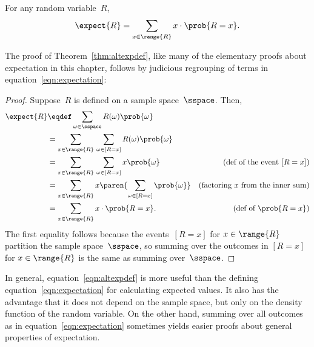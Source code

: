 \begin{theorem}\label{thm:altexpdef}
For any random variable~$R$,
\begin{equation}\label{eqn:altexpdef}
    \expect{R} = \sum_{x \in \range{R}} x \cdot \prob{R = x}.
\end{equation}
\end{theorem}
The proof of Theorem~\ref{thm:altexpdef}, like many of the elementary proofs
about expectation in this chapter, follows by judicious regrouping of terms
in equation~\eqref{eqn:expectation}:
\begin{proof}
Suppose~$R$ is defined on a sample space~$\sspace$.  Then,
\begin{align*}
\expect{R}
    &\eqdef \sum_{\omega \in \sspace} R(\omega) \prob{\omega}\\
    &= \sum_{x \in \range{R}} \, \sum_{\omega \in [R=x]} R(\omega) \prob{\omega}
                \\
    &= \sum_{x \in \range{R}} \, \sum_{\omega \in [R=x]} x \prob{\omega}
            &\text{(def of the event $[R=x]$)}\\
    &= \sum_{x \in \range{R}} x \paren{\sum_{\omega \in [R=x]} \prob{\omega}}
            & \text{(factoring $x$ from the inner sum)} \\
    &= \sum_{x \in \range{R}} x \cdot \prob{R = x}.
            & \text{(def of $\prob{R=x}$)}
\end{align*}
The first equality follows because the events~$[R=x]$ for $x \in
\range{R}$ partition the sample space~$\sspace$, so summing over the
outcomes in $[R=x]$ for $x \in \range{R}$ is the same as summing
over~$\sspace$.
\end{proof}

In general, equation~\eqref{eqn:altexpdef} is more useful than the
defining equation~\eqref{eqn:expectation} for calculating expected
values.  It also has the advantage that it does not depend on the
sample space, but only on the density function of the random variable.
On the other hand, summing over all outcomes as in
equation~\eqref{eqn:expectation} sometimes yields easier proofs about
general properties of expectation.


